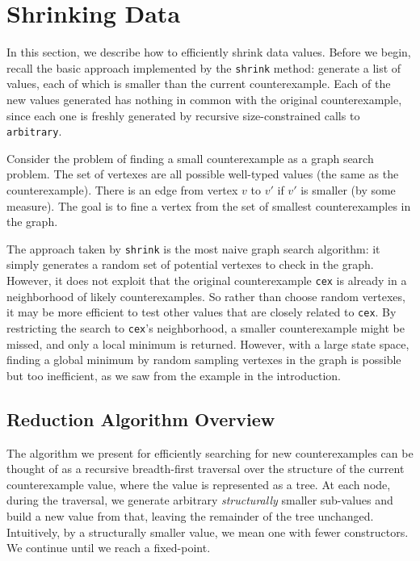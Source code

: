 \documentclass[10pt]{sigplanconf}
\newcommand{\ttp}[1]{\texttt{#1}}
\begin{document}


\section{Shrinking Data}
In this section, we describe how to efficiently shrink data values.  Before we
begin, recall the basic approach implemented by the \ttp{shrink} method:
generate a list of values, each of which is smaller than the current
counterexample.  Each of the new values generated has nothing in common with the
original counterexample, since each one is freshly generated by recursive
size-constrained calls to \ttp{arbitrary}.

Consider the problem of finding a small counterexample as a graph search
problem.  The set of vertexes are all possible well-typed values (the same as
the counterexample).  There is an edge from vertex $v$ to $v'$ if $v'$ is
smaller (by some measure).  The goal is to fine a vertex from the set of
smallest counterexamples in the graph.

The approach taken by \ttp{shrink} is the most naive graph search algorithm:
it simply generates a random set of potential vertexes to check in the graph.
However, it does not exploit that the original counterexample \ttp{cex} is
already in a neighborhood of likely counterexamples.  So rather than choose
random vertexes, it may be more efficient to test other values that are closely
related to \ttp{cex}.  By restricting the search to \ttp{cex}'s neighborhood, a
smaller counterexample might be missed, and only a local minimum is returned.
However, with a large state space, finding a global minimum by random sampling
vertexes in the graph is possible but too inefficient, as we saw from the
example in the introduction.

\subsection{Reduction Algorithm Overview}\label{sec:reduct}
The algorithm we present for efficiently searching for new counterexamples can
be thought of as a recursive breadth-first traversal over the structure of the
current counterexample value, where the value is represented as a tree.  At each
node, during the traversal, we generate arbitrary \emph{structurally} smaller
sub-values and build a new value from that, leaving the remainder of the tree
unchanged.  Intuitively, by a structurally smaller value, we mean one with fewer
constructors.  We continue until we reach a fixed-point.
\end{document}
